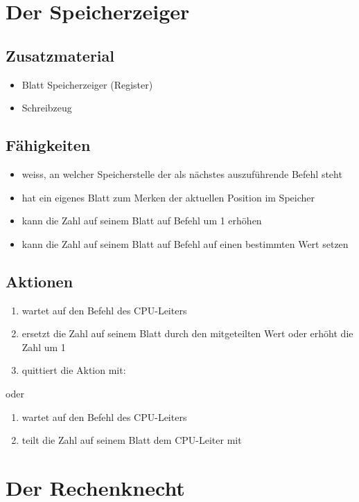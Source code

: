 \documentclass[a4paper]{kinet-intern}
\begin{document}
\pagebreak
\section*{Der Speicherzeiger}

\subsection*{Zusatzmaterial}
\begin{itemize}
	\item Blatt \dq{}Speicherzeiger\dq{} (Register)
	\item Schreibzeug
\end{itemize}

\subsection*{Fähigkeiten}
\begin{itemize}
	\item weiss, an welcher Speicherstelle der als nächstes auszuführende Befehl steht
	\item hat ein eigenes Blatt zum Merken der aktuellen Position im Speicher
	\item kann die Zahl auf seinem Blatt auf Befehl um 1 erhöhen
	\item kann die Zahl auf seinem Blatt auf Befehl auf einen bestimmten Wert setzen
\end{itemize}

\subsection*{Aktionen}
\begin{enumerate}
	\item wartet auf den Befehl des CPU-Leiters
	\item ersetzt die Zahl auf seinem Blatt durch den mitgeteilten Wert oder erhöht die Zahl um 1
	\item quittiert die Aktion mit: 
\end{enumerate}
oder
\begin{enumerate}
	\item wartet auf den Befehl des CPU-Leiters
	\item teilt die Zahl auf seinem Blatt dem CPU-Leiter mit
\end{enumerate}


\vspace{2cm}
\section*{Der Rechenknecht}
\end{document}
